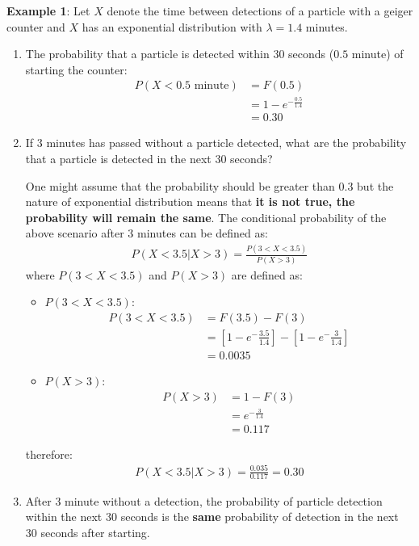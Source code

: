 \documentclass[10pt,a4paper]{article}
\begin{document}
\textbf{Example 1}: Let $X$ denote the time between detections of a particle with a geiger counter
and $X$ has an exponential distribution with $\lambda = 1.4$ minutes. 
\begin{enumerate}
    \item The probability that a particle is detected within $30$ seconds ($0.5$ minute) of starting the counter:
    \begin{align*}
        P(X<0.5 \text{ minute}) &= F(0.5) \\
        &= 1 - e^{-\frac{0.5}{1.4}} \\
        &= 0.30
    \end{align*}

    \item If $3$ minutes has passed without a particle detected, what are the probability that a
    particle is detected in the next $30$ seconds?

    One might assume that the probability should be greater than $0.3$ but the nature of exponential
    distribution means that \textbf{it is not true, the probability will remain the same}. The
    conditional probability of the above scenario after $3$ minutes can be defined as:
    \begin{align*}
        P(X<3.5 | X>3) = \frac{P(3<X<3.5)}{P(X>3)}
    \end{align*}
    where $P(3<X<3.5)$ and $P(X>3)$ are defined as:
    \begin{itemize}
        \item $P(3<X<3.5)$: 
        \begin{align*}
            P(3<X<3.5) &= F(3.5) - F(3) \\
            &= \left[1 - e^-{\frac{3.5}{1.4}}\right] - \left[1 - e^-\frac{3}{1.4}\right] \\
            &= 0.0035
        \end{align*}
        \item $P(X>3)$: 
        \begin{align*}
            P(X>3) &= 1 - F(3) \\
            &= e^{-\frac{3}{1.4}} \\ 
            &= 0.117
        \end{align*}
    \end{itemize}

    therefore:
    \begin{align*}
        P(X<3.5 | X>3) = \frac{0.035}{0.117} = 0.30
    \end{align*}

    \item After $3$ minute without a detection, the probability of particle detection within the
    next $30$ seconds is the \textbf{same} probability of detection in the next $30$ seconds after starting.
\end{enumerate}
\end{document}
